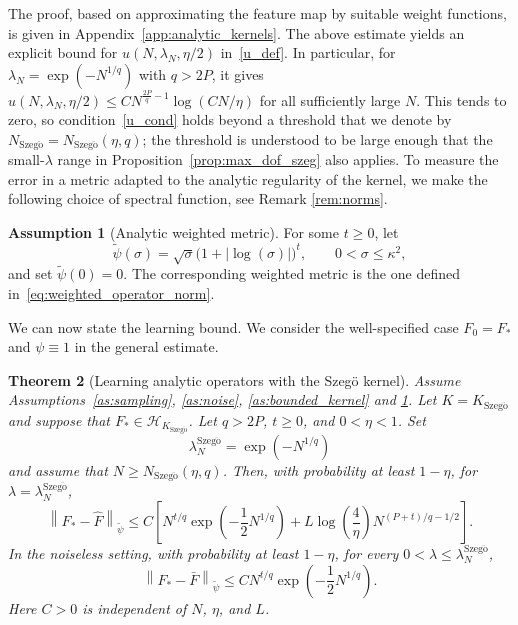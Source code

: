 \documentclass[11pt]{article}
\numberwithin{equation}{section}
\theoremstyle{plain}
\newtheorem{theorem}{Theorem}[section]
\theoremstyle{definition}
\newtheorem{assumption}[theorem]{Assumption}
\theoremstyle{remark}
\newcommand{\Hs}{\mathcal{H}}
\newcommand{\norm}[1]{\left\lVert#1\right\rVert}
\newcommand{\tpsi}{\widetilde{\psi}}
\newcommand{\abs}[1]{\left|#1\right|}
\begin{document}
The proof, based on approximating the feature map by suitable weight
functions, is given in Appendix~\ref{app:analytic_kernels}. The above
estimate yields an explicit bound for
$u(N,\lambda_N,\eta/2)$ in~\eqref{u_def}. In particular, for
$\lambda_N=\exp(-N^{1/q})$ with $q>2P$, it gives
$u(N,\lambda_N,\eta/2)\leq C N^{\frac{2P}{q}-1}\log(CN/\eta)$ for all sufficiently
large $N$. This tends to zero, so condition~\eqref{u_cond} holds beyond a
threshold that we denote by
$N_{\mathrm{Szeg\ddot{o}}}=N_{\mathrm{Szeg\ddot{o}}}(\eta,q)$; the threshold is understood
to be large enough that the small-$\lambda$ range in
Proposition~\ref{prop:max_dof_szeg} also applies. To measure the error in a metric adapted to the analytic regularity of the
kernel, we make the following choice of spectral function, see Remark \ref{rem:norms}.

\begin{assumption}[Analytic weighted metric]
\label{as:szeg_norm}
For some $t\geq0$, let
\[
\tpsi(\sigma)
=
\sqrt{\sigma}\bigl(1+\abs{\log(\sigma)}\bigr)^t,
\qquad
0<\sigma\leq\kappa^2,
\]
and set $\tpsi(0)=0$. The corresponding weighted metric
is the one defined in~\eqref{eq:weighted_operator_norm}.
\end{assumption}

We can now state the learning bound. We consider the well-specified case
$F_0=F_*$ and $\psi\equiv1$ in the general estimate.

\begin{theorem}[Learning analytic operators with the Szegö kernel]
\label{thm:main_szeg_operator}
Assume Assumptions~\ref{as:sampling}, \ref{as:noise},
\ref{as:bounded_kernel} and \ref{as:szeg_norm}. Let $K=K_{\mathrm{Szeg\ddot{o}}}$ and suppose that
$F_*\in\Hs_{K_{\mathrm{Szeg\ddot{o}}}}$. Let $q>2P$, $t\geq0$, and
$0<\eta<1$. Set
\[
\lambda_N^{\mathrm{Szeg\ddot{o}}}
=
\exp\left(-N^{1/q}\right)
\]
and assume that
$N\geq N_{\mathrm{Szeg\ddot{o}}}(\eta,q)$.
Then, with probability at least $1-\eta$, for
$\lambda=\lambda_N^{\mathrm{Szeg\ddot{o}}}$,
\begin{equation}
\norm{F_*-\hat{F}}_{\tpsi}
\leq
C\left[
N^{t/q}
\exp\left(-\frac{1}{2}N^{1/q}\right)
+
L\log\left(\frac{4}{\eta}\right)
N^{(P+t)/q-1/2}
\right].
\label{eq:main_szeg_operator}
\end{equation}
In the noiseless setting, with probability at least $1-\eta$, for every
$0<\lambda\leq\lambda_N^{\mathrm{Szeg\ddot{o}}}$,
\begin{equation}
\norm{F_*-\bar{F}}_{\tpsi}
\leq
C N^{t/q}
\exp\left(-\frac{1}{2}N^{1/q}\right).
\label{eq:main_szeg_operator_noiseless}
\end{equation}
Here $C>0$ is independent of $N$, $\eta$, and $L$.
\end{theorem}
\end{document}
